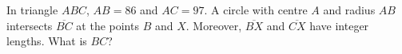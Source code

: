 In triangle $ABC$, $AB=86$ and $AC=97$. A circle with centre $A$ and radius $AB$ intersects $\overline{BC}$ at the points $B$ and $X$. Moreover, $\overline{BX}$ and $\overline{CX}$ have integer lengths. What is $BC$?
